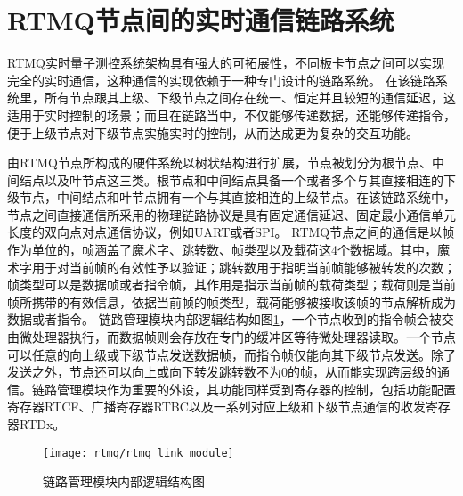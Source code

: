 \newpage
\section[RTMQ节点间的实时通信链路系统]{RTMQ节点间的实时通信链路系统\label{section:rtmq_links}}

RTMQ实时量子测控系统架构具有强大的可拓展性，不同板卡节点之间可以实现完全的实时通信，这种通信的实现依赖于一种专门设计的链路系统。
在该链路系统里，所有节点跟其上级、下级节点之间存在统一、恒定并且较短的通信延迟，这适用于实时控制的场景；而且在链路当中，不仅能够传递数据，还能够传递指令，便于上级节点对下级节点实施实时的控制，从而达成更为复杂的交互功能。

由RTMQ节点所构成的硬件系统以树状结构进行扩展，节点被划分为根节点、中间结点以及叶节点这三类。根节点和中间结点具备一个或者多个与其直接相连的下级节点，中间结点和叶节点拥有一个与其直接相连的上级节点。在该链路系统中，节点之间直接通信所采用的物理链路协议是具有固定通信延迟、固定最小通信单元长度的双向点对点通信协议，例如UART或者SPI。
RTMQ节点之间的通信是以帧作为单位的，帧涵盖了魔术字、跳转数、帧类型以及载荷这4个数据域。其中，魔术字用于对当前帧的有效性予以验证；跳转数用于指明当前帧能够被转发的次数；帧类型可以是数据帧或者指令帧，其作用是指示当前帧的载荷类型；载荷则是当前帧所携带的有效信息，依据当前帧的帧类型，载荷能够被接收该帧的节点解析成为数据或者指令。
链路管理模块内部逻辑结构如图\ref{fig:rtmq_link_module}，一个节点收到的指令帧会被交由微处理器执行，而数据帧则会存放在专门的缓冲区等待微处理器读取。一个节点可以任意的向上级或下级节点发送数据帧，而指令帧仅能向其下级节点发送。除了发送之外，节点还可以向上或向下转发跳转数不为0的帧，从而能实现跨层级的通信。链路管理模块作为重要的外设，其功能同样受到寄存器的控制，包括功能配置寄存器RTCF、广播寄存器RTBC以及一系列对应上级和下级节点通信的收发寄存器RTDx。

\begin{figure}
    \centering
    \texttt{[image: rtmq/rtmq\_link\_module]}
    \caption[链路管理模块内部逻辑结构图]{链路管理模块内部逻辑结构图\label{fig:rtmq_link_module}}
\end{figure}



